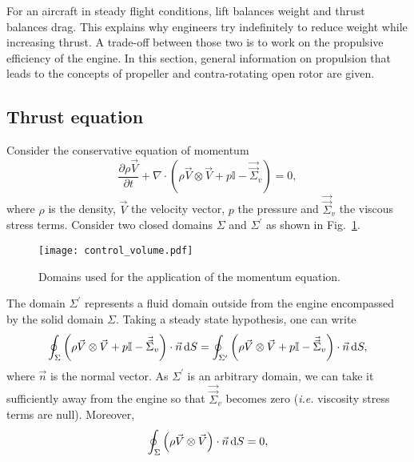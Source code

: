 
For an aircraft in steady flight conditions, 
lift balances weight and 
thrust balances drag. This explains why engineers try
indefinitely to reduce weight while increasing
thrust. A trade-off between those two is to work
on the propulsive efficiency of the engine. In this
section, general information on propulsion
that leads to the concepts of propeller and
contra-rotating open rotor are given.

\subsection{Thrust equation}
\label{sub:cror_thrust}
Consider the conservative equation of momentum
\begin{equation}
	\frac{\partial \rho \vec{V}}{\partial t} 
	+ \nabla \cdot (\rho \vec{V} \otimes \vec{V} + p \mathbb{I} - \vec{\vec{\Sigma}}_v) = 0,
\end{equation}
where $\rho$ is the density, $\vec{V}$ the velocity vector, $p$ the pressure and
$\vec{\vec{\Sigma}}_v$ the viscous stress terms.
Consider two closed domains $\Sigma$ and $\Sigma^\prime$ as
shown in Fig.~\ref{fig:cror_control_volume}.
\begin{figure}[htp]
  \centering
  \texttt{[image: control\_volume.pdf]}
  \caption{Domains used for the application of the momentum equation.}
  \label{fig:cror_control_volume}
\end{figure}
The domain $\Sigma^\prime$ represents a fluid domain outside from the
engine encompassed by the solid domain $\Sigma$.
Taking a steady state hypothesis, one can write
\begin{equation}
	\oint_{\Sigma} \left(\rho \vec{V} \otimes \vec{V} + 
	                       p \mathbb{I} - 
	                       \vec{\vec{\Sigma}}_v \right) \cdot \vec{n} \mathop{}\!\mathrm{d} S
    =
   	\oint_{\Sigma^\prime} \left(\rho \vec{V} \otimes \vec{V} + 
	                       p \mathbb{I} - 
	                       \vec{\vec{\Sigma}}_v \right) \cdot \vec{n} \mathop{}\!\mathrm{d} S,
\end{equation} 
where $\vec{n}$ is the normal vector.
As $\Sigma^\prime$ is an arbitrary domain, we can take it sufficiently
away from the engine so that $\vec{\vec{\Sigma}}_v$ becomes zero (\emph{i.e.}
viscosity stress terms are null).
Moreover, 
\begin{equation}
	\oint_{\Sigma} \left(\rho \vec{V} \otimes \vec{V} \right) \cdot \vec{n} \mathop{}\!\mathrm{d} S = 0,
\end{equation}
